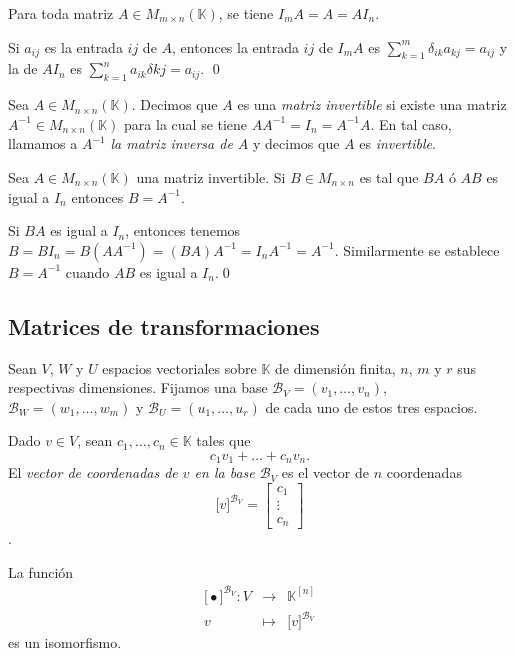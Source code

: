 \begin{prop}
Para toda matriz $A\in M_{m\times n}(\mathbb{K})$, se tiene $I_mA=A=AI_n$.
\end{prop}

\dem Si $a_{ij}$ es la entrada $ij$ de $A$, entonces la entrada $ij$ de $I_mA$ es $\sum_{k=1}^m \delta_{ik}a_{kj}=a_{ij}$ y la de $AI_n$ es $\sum_{k=1}^na_{ik}\delta{kj}=a_{ij}$. \qed

\begin{defn}
Sea $A\in M_{n\times n}(\mathbb{K})$. Decimos que $A$ es una \emph{matriz invertible} si existe una matriz $A^{-1}\in M_{n\times n}(\mathbb{K})$ para la cual se tiene $AA^{-1}=I_n=A^{-1}A$. En tal caso, llamamos a $A^{-1}$ \emph{la matriz inversa de $A$} y decimos que $A$ es \emph{invertible}.
\end{defn}

\begin{prop}
Sea $A\in M_{n\times n}(\mathbb{K})$ una matriz invertible. Si $B\in M_{n\times n}$ es tal que $BA$ \'o $AB$ es igual a $I_n$ entonces $B=A^{-1}$.
\end{prop}

\dem Si $BA$ es igual a $I_n$, entonces tenemos $B=BI_n=B(AA^{-1})=(BA)A^{-1}=I_nA^{-1}=A^{-1}$. Similarmente se establece $B=A^{-1}$ cuando $AB$ es igual a $I_n$.\qed

\subsection*{Matrices de transformaciones}

Sean $V$, $W$ y $U$ espacios vectoriales sobre $\mathbb{K}$ de dimensi\'on finita, $n$, $m$ y $r$ sus respectivas dimensiones. Fijamos una base $\mathcal{B}_V=(v_1,\ldots,v_n)$, $\mathcal{B}_W=(w_1,\ldots,w_m)$ y $\mathcal{B}_U=(u_1,\ldots,u_r)$ de cada uno de estos tres espacios.

\begin{defn}
Dado $v\in V$, sean $c_1,\ldots,c_n\in \mathbb{K}$ tales que
$$c_1v_1+\ldots+c_nv_n.$$
El \emph{vector de coordenadas de $v$ en la base $\mathcal{B}_V$} es el vector de $n$ coordenadas 
$$\Big[ v \Big]^{\mathcal{B}_V}=\left[\begin{array}{c}
  c_{1}\\
  \vdots\\
  c_{n}
  \end{array}\right]$$.
\end{defn}

\begin{prop}
La funci\'on
\begin{eqnarray*}
\Big[ \bullet \Big]^{\mathcal{B}_V}: V & \longrightarrow & \mathbb{K}^{[n]}\\
v & \longmapsto & \Big[ v \Big]^{\mathcal{B}_V}
\end{eqnarray*}
es un isomorfismo.
\end{prop}

